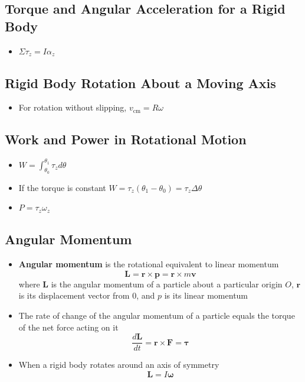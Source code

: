 \documentclass{article}
\begin{document}
\subsection{Torque and Angular Acceleration for a Rigid Body}

\begin{itemize}
    \item $\Sigma\tau_z = I\alpha_z$
\end{itemize}

\subsection{Rigid Body Rotation About a Moving Axis}

\begin{itemize}
    \item For rotation without slipping, $v_\textrm{cm}=R\omega$
\end{itemize}

\subsection{Work and Power in Rotational Motion}

\begin{itemize}
    \item $W=\int_{\theta_0}^{\theta_1}\tau_z d\theta$

    \item If the torque is constant $W=\tau_z(\theta_1-\theta_0)=\tau_z\Delta\theta$

    \item $P=\tau_z\omega_z$
\end{itemize}

\subsection{Angular Momentum}

\begin{itemize}
    \item \textbf{Angular momentum} is the rotational equivalent to linear momentum \[\mathbf L = \mathbf r \times \mathbf p = \mathbf r \times m \mathbf v\] where $\mathbf L$ is the angular momentum of a particle about a particular origin $O$, $\mathbf r$ is its displacement vector from $0$, and $p$ is its linear momentum

    \item The rate of change of the angular momentum of a particle equals the torque of the net force acting on it \[\frac{d\mathbf L}{dt}=\mathbf r \times \mathbf F = \boldsymbol \tau\]

    \item When a rigid body rotates around an axis of symmetry \[\mathbf L = I \boldsymbol \omega\]
\end{itemize}
\end{document}
